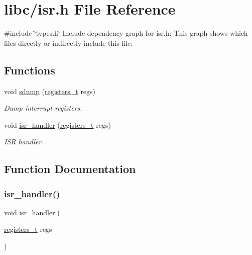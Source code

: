 \hypertarget{a00110}{}\section{libc/isr.h File Reference}
\label{a00110}
{\ttfamily \#include \char`\"{}types.\+h\char`\"{}}\newline
Include dependency graph for isr.\+h\+:
This graph shows which files directly or indirectly include this file\+:
\subsection*{Functions}
\begin{DoxyCompactItemize}
\item 
void \hyperlink{a00110_a4b4233daef6e041e7278cae2b21b5ed4_a4b4233daef6e041e7278cae2b21b5ed4}{sdump} (\hyperlink{a00134_adf58dbaf6139b4957c348711f2026957_adf58dbaf6139b4957c348711f2026957}{registers\+\_\+t} regs)
\begin{DoxyCompactList}\small\item\em Dump interrupt registers. \end{DoxyCompactList}\item 
void \hyperlink{a00110_a700e3ca056bf69296370f504f2cb6cc8_a700e3ca056bf69296370f504f2cb6cc8}{isr\+\_\+handler} (\hyperlink{a00134_adf58dbaf6139b4957c348711f2026957_adf58dbaf6139b4957c348711f2026957}{registers\+\_\+t} regs)
\begin{DoxyCompactList}\small\item\em I\+SR handler. \end{DoxyCompactList}\end{DoxyCompactItemize}


\subsection{Function Documentation}
\mbox{\label{a00110_a700e3ca056bf69296370f504f2cb6cc8_a700e3ca056bf69296370f504f2cb6cc8}} 
\subsubsection{\texorpdfstring{isr\+\_\+handler()}{isr\_handler()}}
{\footnotesize\ttfamily void isr\+\_\+handler (\begin{DoxyParamCaption}\item[{\hyperlink{a00134_adf58dbaf6139b4957c348711f2026957_adf58dbaf6139b4957c348711f2026957}{registers\+\_\+t}}]{regs }\end{DoxyParamCaption})}




